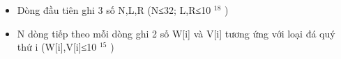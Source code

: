\begin{itemize}
	\item     Dòng đầu tiên ghi 3 số N,L,R (N≤32; L,R≤10    $^     18    $    )   
	\item     N dòng tiếp theo mỗi dòng ghi 2 số W[i] và V[i] tương ứng với loại đá quý thứ i (W[i],V[i]≤10    $^     15    $    )   
\end{itemize}

\